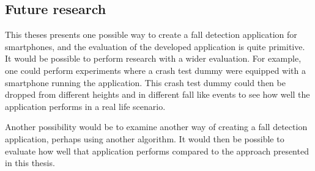 \documentclass[12pt, a4paper, onecolumn]{article}
\begin{document}
	\subsection{Future research}
	
	This theses presents one possible way to create a fall detection application for smartphones, and the evaluation of the developed application is quite primitive. It would be possible to perform research with a wider evaluation. For example, one could perform experiments where a crash test dummy were equipped with a smartphone running the application. This crash test dummy could then be dropped from different heights and in different fall like events to see how well the application performs in a real life scenario.
	
	Another possibility would be to examine another way of creating a fall detection application, perhaps using another algorithm. It would then be possible to evaluate how well that application performs compared to the approach presented in this thesis.
	\newpage
		
	
	
\end{document}

